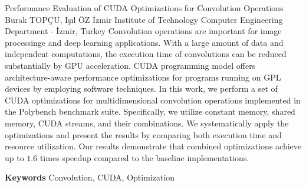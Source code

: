 
    \begin{abstract_online}{Performance Evaluation of CUDA Optimizations for Convolution Operations}{%
        Burak TOPÇU, Işıl ÖZ}{%
        }{%
        İzmir Institute of Technology Computer Engineering Department - İzmir, Turkey}
    Convolution operations are important for image processinge and deep learning applications. With a large amount of data and independent computations, the execution time of convolutions can be reduced substantially by GPU acceleration. CUDA programming model offers architecture-aware performance optimizations for programs running on GPL devices by employing software techniques. In this work, we perform a set of CUDA optimizations for multidimensional convolution operations implemented in the Polybench benchmark suite. Specifically, we utilize constant memory, shared memory, CUDA streams, and their combinations. We systematically apply the optimizations and present the results by comparing both execution time and resource utilization. Our results demonstrate that combined optimizations achieve up to $1.6$ times speedup compared to the baseline implementations. 
    
        \textbf{Keywords} \newline{}Convolution, CUDA, Optimization
    \end{abstract_online}
    
